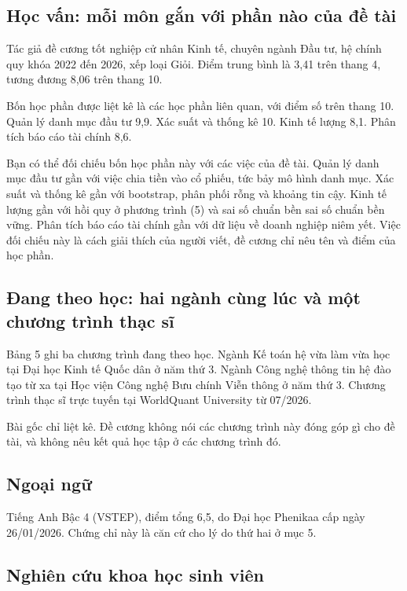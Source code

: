 \subsection{Học vấn: mỗi môn gắn với phần nào của đề tài}

Tác giả đề cương tốt nghiệp cử nhân Kinh tế, chuyên ngành Đầu tư, hệ chính quy khóa 2022 đến 2026, xếp loại Giỏi. Điểm trung bình là 3,41 trên thang 4, tương đương 8,06 trên thang 10.

Bốn học phần được liệt kê là các học phần liên quan, với điểm số trên thang 10. Quản lý danh mục đầu tư 9,9. Xác suất và thống kê 10. Kinh tế lượng 8,1. Phân tích báo cáo tài chính 8,6.

Bạn có thể đối chiếu bốn học phần này với các việc của đề tài. Quản lý danh mục đầu tư gần với việc chia tiền vào cổ phiếu, tức bảy mô hình danh mục. Xác suất và thống kê gần với bootstrap, phân phối rỗng và khoảng tin cậy. Kinh tế lượng gần với hồi quy ở phương trình (5) và sai số chuẩn bền sai số chuẩn bền vững. Phân tích báo cáo tài chính gần với dữ liệu về doanh nghiệp niêm yết. Việc đối chiếu này là cách giải thích của người viết, đề cương chỉ nêu tên và điểm của học phần.

\subsection{Đang theo học: hai ngành cùng lúc và một chương trình thạc sĩ}

Bảng 5 ghi ba chương trình đang theo học. Ngành Kế toán hệ vừa làm vừa học tại Đại học Kinh tế Quốc dân ở năm thứ 3. Ngành Công nghệ thông tin hệ đào tạo từ xa tại Học viện Công nghệ Bưu chính Viễn thông ở năm thứ 3. Chương trình thạc sĩ trực tuyến tại WorldQuant University từ 07/2026.

Bài gốc chỉ liệt kê. Đề cương không nói các chương trình này đóng góp gì cho đề tài, và không nêu kết quả học tập ở các chương trình đó.

\subsection{Ngoại ngữ}

Tiếng Anh Bậc 4 (VSTEP), điểm tổng 6,5, do Đại học Phenikaa cấp ngày 26/01/2026. Chứng chỉ này là căn cứ cho lý do thứ hai ở mục 5.

\subsection{Nghiên cứu khoa học sinh viên}


